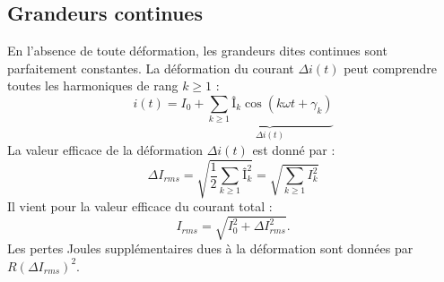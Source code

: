 	\subsection{Grandeurs continues}
		En l'absence de toute déformation, les grandeurs dites continues sont parfaitement constantes. La déformation du courant $\Delta i(t)$ peut comprendre toutes les harmoniques de rang $k\geq 1$ : 
		\begin{equation}
			i(t) = I_0 + \underbrace{\sum _{k\geq 1} Î_k \cos (k\omega t +\gamma _k)}_{\Delta i(t)}
		\end{equation}
		La valeur efficace de la déformation $\Delta i(t)$ est donné par : 
		\begin{equation}
			\Delta I_{rms} = \sqrt{\frac{1}{2}\sum _{k\geq 1} Î_k^2} = \sqrt{\sum _{k\geq 1} I_k^2}
		\end{equation}
		Il vient pour la valeur efficace du courant total : 
		\begin{equation}
			I_{rms} = \sqrt{I_0^2+\Delta I^2_{rms}}.
		\end{equation}
		Les pertes Joules supplémentaires dues à la déformation sont données par $R(\Delta I_{rms})^2$. 
		

